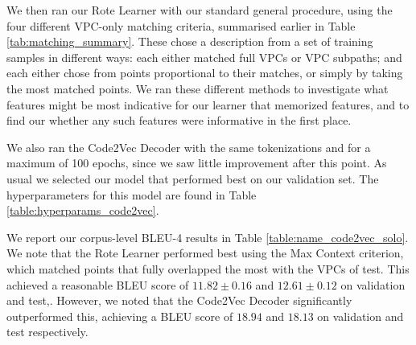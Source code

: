 We then ran our Rote Learner with our standard general procedure, using the four different VPC-only matching criteria, summarised earlier in Table \ref{tab:matching_summary}. These chose a description from a set of training samples in different ways: each either matched full VPCs or VPC subpaths; and each either chose from points proportional to their matches, or simply by taking the most matched points.
We ran these different methods to investigate what features might be most indicative for our learner that memorized features, and to find our whether any such features were informative in the first place.

We also ran the Code2Vec Decoder with the same tokenizations and for a maximum of 100 epochs, since we saw little improvement after this point.
As usual we selected our model that performed best on our validation set.
The hyperparameters for this model are found in Table \ref{table:hyperparams_code2vec}.

We report our corpus-level BLEU-4 results in Table \ref{table:name_code2vec_solo}. We note that the Rote Learner performed best using the Max Context criterion, which matched points that fully overlapped the most with the VPCs of test. This achieved a reasonable BLEU score of $ 11.82 \pm  0.16 $ and  $ 12.61 \pm 0.12 $ on validation and test,. However, we noted that the Code2Vec Decoder significantly outperformed this, achieving a BLEU score of $ 18.94 $ and $ 18.13 $ on validation and test respectively.


